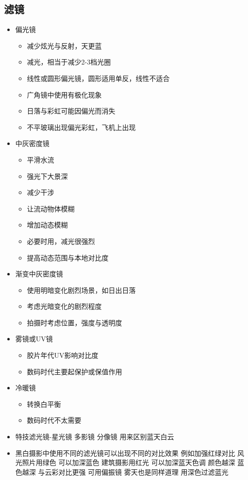 \documentclass[
  letterpaper,
  DIV=11,
  numbers=noendperiod]{scrreprt}
\providecommand{\tightlist}{%
  \setlength{\itemsep}{0pt}\setlength{\parskip}{0pt}}\usepackage{longtable,booktabs,array}
\begin{document}
\subsection{滤镜}\label{ux6ee4ux955c}

\begin{itemize}
\tightlist
\item
  偏光镜

  \begin{itemize}
  \tightlist
  \item
    减少炫光与反射，天更蓝
  \item
    减光，相当于减少2-3档光圈
  \item
    线性或圆形偏光镜，圆形适用单反，线性不适合
  \item
    广角镜中使用有极化现象
  \item
    日落与彩虹可能因偏光而消失
  \item
    不平玻璃出现偏光彩虹，飞机上出现
  \end{itemize}
\item
  中灰密度镜

  \begin{itemize}
  \tightlist
  \item
    平滑水流
  \item
    强光下大景深
  \item
    减少干涉
  \item
    让流动物体模糊
  \item
    增加动态模糊
  \item
    必要时用，减光很强烈
  \item
    提高动态范围与本地对比度
  \end{itemize}
\item
  渐变中灰密度镜

  \begin{itemize}
  \tightlist
  \item
    使用明暗变化剧烈场景，如日出日落
  \item
    考虑光暗变化的剧烈程度
  \item
    拍摄时考虑位置，强度与透明度
  \end{itemize}
\item
  雾镜或UV镜

  \begin{itemize}
  \tightlist
  \item
    胶片年代UV影响对比度
  \item
    数码时代主要起保护或保值作用
  \end{itemize}
\item
  冷暖镜

  \begin{itemize}
  \tightlist
  \item
    转换白平衡
  \item
    数码时代不太需要
  \end{itemize}
\item
  特技滤光镜-星光镜 多影镜 分像镜 用来区别蓝天白云
\item
  黑白摄影中使用不同的滤光镜可以出现不同的对比效果 例如加强红绿对比
  风光照片用绿色 可以加深蓝色 建筑摄影用红光 可以加深蓝天色调 颜色越深
  蓝色越深 与云彩对比更强 可用偏振镜 雾天也是同样道理 用深色过滤蓝光
\end{itemize}
\end{document}
